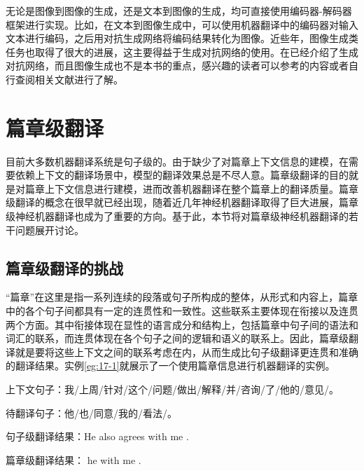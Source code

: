 \parinterval 无论是图像到图像的生成，还是文本到图像的生成，均可直接使用编码器-解码器框架进行实现。比如，在文本到图像生成中，可以使用机器翻译中的编码器对输入文本进行编码，之后用对抗生成网络将编码结果转化为图像。近些年，图像生成类任务也取得了很大的进展，这主要得益于生成对抗网络的使用。在{\chapterthirteen}已经介绍了生成对抗网络，而且图像生成也不是本书的重点，感兴趣的读者可以参考{\chapterthirteen}的内容或者自行查阅相关文献进行了解。

\sectionnewpage
\section{篇章级翻译}

\parinterval 目前大多数机器翻译系统是句子级的。由于缺少了对篇章上下文信息的建模，在需要依赖上下文的翻译场景中，模型的翻译效果总是不尽人意。篇章级翻译的目的就是对篇章上下文信息进行建模，进而改善机器翻译在整个篇章上的翻译质量。篇章级翻译的概念在很早就已经出现，随着近几年神经机器翻译取得了巨大进展，篇章级神经机器翻译也成为了重要的方向。基于此，本节将对篇章级神经机器翻译的若干问题展开讨论。


\subsection{篇章级翻译的挑战}

\parinterval “篇章”在这里是指一系列连续的段落或句子所构成的整体，从形式和内容上，篇章中的各个句子间都具有一定的连贯性和一致性。这些联系主要体现在衔接以及连贯两个方面。其中衔接体现在显性的语言成分和结构上，包括篇章中句子间的语法和词汇的联系，而连贯体现在各个句子之间的逻辑和语义的联系上。因此，篇章级翻译就是要将这些上下文之间的联系考虑在内，从而生成比句子级翻译更连贯和准确的翻译结果。实例\ref{eg:17-1}就展示了一个使用篇章信息进行机器翻译的实例。

\begin{example}
上下文句子：我/上周/针对/这个/问题/做出/解释/并/咨询/了/他的/意见/。

\hspace{2em} 待翻译句子：他/也/同意/我的/看法/。

\hspace{2em} 句子级翻译结果：He also agrees with me .

\hspace{2em} 篇章级翻译结果：{} he {} with me .

\label{eg:17-1}
\end{example}

